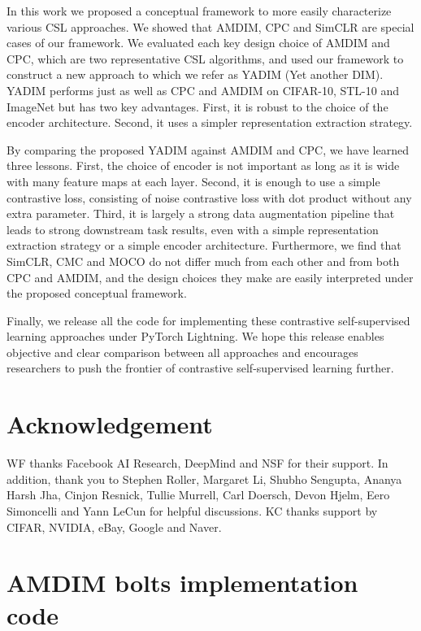 \documentclass{article}
\begin{document}
In this work we proposed a conceptual framework to more easily characterize various CSL approaches. We showed that AMDIM, CPC and SimCLR are special cases of our framework. We evaluated each key design choice of AMDIM and CPC, which are two representative CSL algorithms, and used our framework to construct a new approach to which we refer as YADIM (Yet another DIM). YADIM performs just as well as CPC and AMDIM on CIFAR-10, STL-10 and ImageNet but has two key advantages. First, it is robust to the choice of the encoder architecture. Second, it uses a simpler representation extraction strategy. 

By comparing the proposed YADIM against AMDIM and CPC, we have learned three lessons. First, the choice of encoder is not important as long as it is wide with many feature maps at each layer. Second, it is enough to use  a simple contrastive loss, consisting of noise contrastive loss with dot product without any extra parameter. Third, it is largely a strong data augmentation pipeline that leads to strong downstream task results, even with a simple representation extraction strategy or a simple encoder architecture. Furthermore, we find that SimCLR, CMC and MOCO
do not differ much from each other and from both CPC and AMDIM, and the design choices they make are easily interpreted under the proposed conceptual framework.

Finally, we release all the code for implementing these contrastive self-supervised learning approaches under PyTorch Lightning. We hope this release enables objective and clear comparison between all approaches and encourages researchers to push the frontier of contrastive self-supervised learning further.

\section*{Acknowledgement}

WF thanks Facebook AI Research, DeepMind and NSF for their support. In addition, thank you to Stephen Roller, Margaret Li, Shubho Sengupta, Ananya Harsh Jha, Cinjon Resnick, Tullie Murrell, Carl Doersch, Devon Hjelm, Eero Simoncelli and Yann LeCun for helpful discussions.
KC thanks support by CIFAR, NVIDIA, eBay, Google and Naver. 






\medskip

\newpage
\appendix
\section{AMDIM bolts implementation code}\label{ap:amdim}
\end{document}
